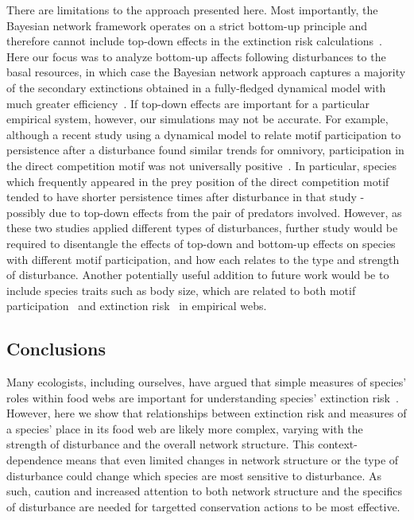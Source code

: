 \documentclass[12pt]{article}
\begin{document}
\begin{spacing}{2.0}
    There are limitations to the approach presented here.
    Most importantly, the Bayesian network framework operates on a strict bottom-up principle and therefore cannot include top-down effects in the extinction risk calculations~\citep{Eklof2013}. 
    Here our focus was to analyze bottom-up affects following disturbances to the basal resources, in which case the Bayesian network approach captures a majority of the secondary extinctions obtained in a fully-fledged dynamical model with much greater efficiency~\citep{Eklof2013}.
    If top-down effects are important for a particular empirical system, however, our simulations may not be accurate. 
    For example, although a recent study using a dynamical model to relate motif participation to persistence after a disturbance found similar trends for omnivory, participation in the direct competition motif was not universally positive~\citep{Cirtwill2021_inprep}.
    In particular, species which frequently appeared in the prey position of the direct competition motif tended to have shorter persistence times after disturbance in that study - possibly due to top-down effects from the pair of predators involved.
    However, as these two studies applied different types of disturbances, further study would be required to disentangle the effects of top-down and bottom-up effects on species with different motif participation, and how each relates to the type and strength of disturbance.
    Another potentially useful addition to future work would be to include species traits such as body size, which are related to both motif participation~\citep{cirtwill2018feeding} and extinction risk~\citep{Brose2017, curtsdotter2011robustness, Cardillo2005, Purvis2000} in empirical webs.

    
    
    \subsection*{Conclusions}
    
    Many ecologists, including ourselves, have argued that simple measures of species' roles within food webs are important for understanding species' extinction risk~\citep{Santos2021,curtsdotter2011robustness, dunne2009cascading, Eklof2006,binzer2011susceptibility}. 
    However, here we show that relationships between extinction risk and measures of a species' place in its food web are likely more complex, varying with the strength of disturbance and the overall network structure.
    This context-dependence means that even limited changes in network structure or the type of disturbance could change which species are most sensitive to disturbance. 
    As such, caution and increased attention to both network structure and the specifics of disturbance are needed for targetted conservation actions to be most effective. 
    

\end{spacing}
\end{document}
